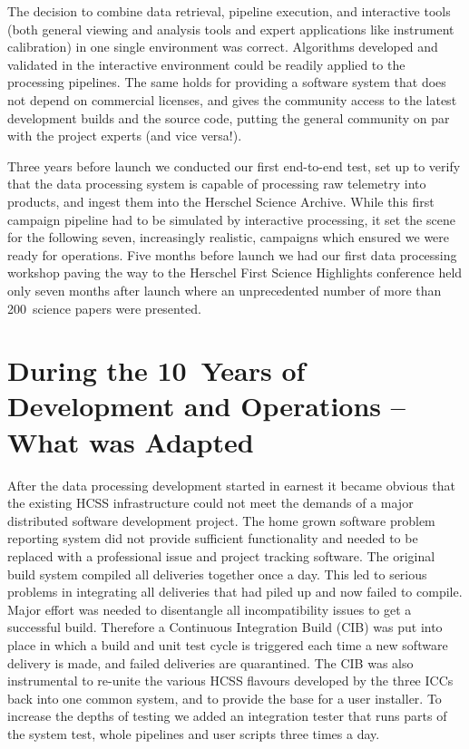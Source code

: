 The decision to combine data retrieval, pipeline execution, and interactive tools (both general viewing and analysis tools and expert applications like instrument calibration) in one single environment was correct. Algorithms developed and validated in the interactive environment could be readily applied to the processing pipelines. The same holds for providing a software system that does not depend on commercial licenses, and gives the community access to the latest development builds and the source code, putting the general community on par with the project experts (and vice versa!).

Three years before launch we conducted our first end-to-end test, set up to verify that the data processing system is capable of processing raw telemetry into products, and ingest them into the Herschel Science Archive. While this first campaign pipeline had to be simulated by interactive processing, it set the scene for the following seven, increasingly realistic, campaigns which ensured we were ready for operations. Five months before launch we had our first data processing workshop paving the way to the Herschel First Science Highlights conference held only seven months after launch where an unprecedented number of more than 200~science papers were presented.


\section{During the 10~Years of Development and Operations -- What was Adapted}

After the data processing development started in earnest it became obvious that the existing HCSS infrastructure could not meet the demands of a major distributed software development project. The home grown software problem reporting system did not provide sufficient functionality and needed to be replaced with a professional issue and project tracking software. The original build system compiled all deliveries together once a day. This led to serious problems in integrating all deliveries that had piled up and now failed to compile. Major effort was needed to disentangle all incompatibility issues to get a successful build. Therefore a Continuous Integration Build (CIB) was put into place in which a build and unit test cycle is triggered each time a new software delivery is made, and failed deliveries are quarantined. The CIB was also instrumental to re-unite the various HCSS flavours developed by the three ICCs back into one common system, and to provide the base for a user installer. To increase the depths of testing we added an integration tester that runs parts of the system test, whole pipelines and user scripts three times a day.

